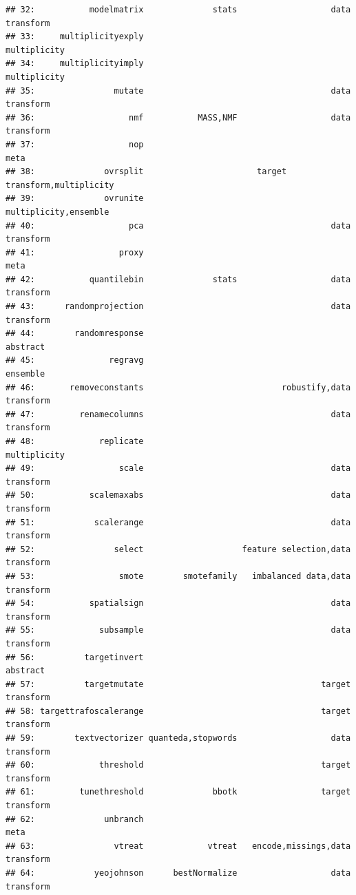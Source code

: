 \documentclass[
]{scrbook}
\begin{document}
\begin{verbatim}
## 32:           modelmatrix              stats                   data transform
## 33:     multiplicityexply                                        multiplicity
## 34:     multiplicityimply                                        multiplicity
## 35:                mutate                                      data transform
## 36:                   nmf           MASS,NMF                   data transform
## 37:                   nop                                                meta
## 38:              ovrsplit                       target transform,multiplicity
## 39:              ovrunite                               multiplicity,ensemble
## 40:                   pca                                      data transform
## 41:                 proxy                                                meta
## 42:           quantilebin              stats                   data transform
## 43:      randomprojection                                      data transform
## 44:        randomresponse                                            abstract
## 45:               regravg                                            ensemble
## 46:       removeconstants                            robustify,data transform
## 47:         renamecolumns                                      data transform
## 48:             replicate                                        multiplicity
## 49:                 scale                                      data transform
## 50:           scalemaxabs                                      data transform
## 51:            scalerange                                      data transform
## 52:                select                    feature selection,data transform
## 53:                 smote        smotefamily   imbalanced data,data transform
## 54:           spatialsign                                      data transform
## 55:             subsample                                      data transform
## 56:          targetinvert                                            abstract
## 57:          targetmutate                                    target transform
## 58: targettrafoscalerange                                    target transform
## 59:        textvectorizer quanteda,stopwords                   data transform
## 60:             threshold                                    target transform
## 61:         tunethreshold              bbotk                 target transform
## 62:              unbranch                                                meta
## 63:                vtreat             vtreat   encode,missings,data transform
## 64:            yeojohnson      bestNormalize                   data transform

\end{verbatim}
\end{document}
